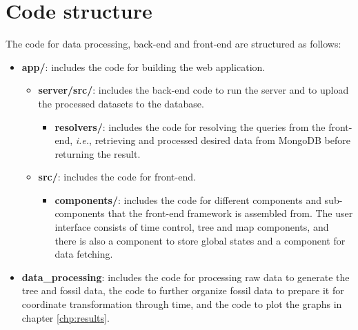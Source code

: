 \documentclass[11pt, a4paper,oneside,chapterprefix=false]{scrbook}
\begin{document}
\section{Code structure} \label{sec:implementation_code_structure}
The code for data processing, back-end and front-end are structured as follows: 
\begin{itemize}
	\item \textbf{app/}: includes the code for building the web application.
	\begin{itemize}	
		\item \textbf{server/src/}: includes the back-end code to run the server and to upload the processed datasets to the database.
		\begin{itemize}	
			\item \textbf{resolvers/}: includes the code for resolving the queries from the front-end, \textit{i.e.}, retrieving and processed desired data from MongoDB before returning the result.
		\end{itemize}
		\item \textbf{src/}: includes the code for front-end.
		\begin{itemize}	
			\item \textbf{components/}: includes the code for different components and sub-components that the front-end framework is assembled from. The user interface consists of time control, tree and map components, and there is also a component to store global states and a component for data fetching.
		\end{itemize}
	\end{itemize}
	
	\item \textbf{data\_processing}: includes the code for processing raw data to generate the tree and fossil data, the code to further organize fossil data to prepare it for coordinate transformation through time, and the code to plot the graphs in chapter \ref{chp:results}.
\end{itemize}
\newpage
\end{document}
